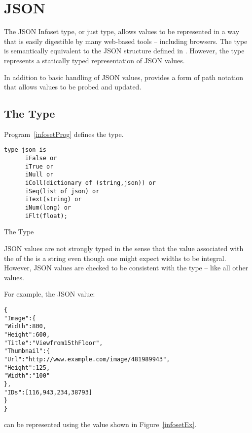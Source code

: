 \chapter{JSON}

The JSON Infoset type, or just  type, allows values to be represented in a way that is easily digestible by many web-based tools -- including browsers. The  type is semantically equivalent to the JSON structure defined in \cite{rfc4627}. However, the  type represents a statically typed representation of JSON values.

In addition to basic handling of JSON values, \Sr provides a form of path notation that allows  values to be probed and updated.

\section{The  Type}
\label{infosetType}

Program~\vref{infosetProg} defines the  type.
\begin{program}
\begin{lstlisting}
type json is 
      iFalse or
      iTrue or
      iNull or
      iColl(dictionary of (string,json)) or
      iSeq(list of json) or
      iText(string) or
      iNum(long) or
      iFlt(float);
\end{lstlisting}
\caption{The  Type\label{infosetProg}}
\end{program}

\begin{aside}
JSON values are not strongly typed in the sense that the value associated with the  of the  is a string even though one might expect widths to be integral. However, JSON values are checked to be consistent with the  type -- like all other values.
\end{aside}

For example, the JSON value:
\begin{alltt}
\{
  "Image": \{
    "Width":  800,
    "Height": 600,
    "Title":  "View from 15th Floor",
    "Thumbnail": \{
      "Url":    "http://www.example.com/image/481989943",
      "Height": 125,
      "Width":  "100"
    \},
    "IDs": [116, 943, 234, 38793]
  \}
\}
\end{alltt}
can be represented using the  value shown in Figure~\vref{infosetEx}.

